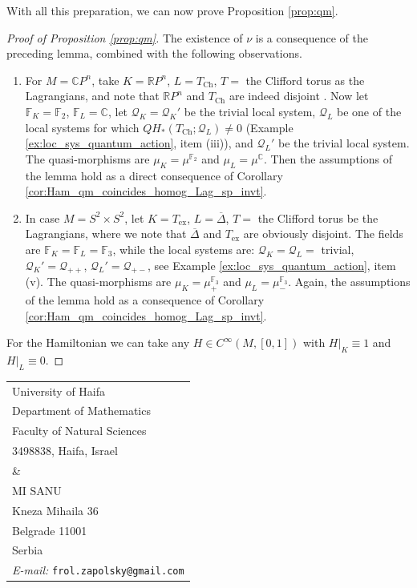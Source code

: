 \documentclass[11pt%
]{article}
\theoremstyle{definition}
\newcommand{\R}{{\mathbb{R}}}
\newcommand{\F}{{\mathbb{F}}}
\newcommand{\C}{{\mathbb{C}}}
\newcommand{\cQ}{{\mathcal{Q}}}
\newcommand{\ol}{\overline}
\DeclareMathOperator{\0}{\operatorname{\mathbf{0}}}
\begin{document}
With all this preparation, we can now prove Proposition \ref{prop:qm}.
\begin{proof}[Proof of Proposition \ref{prop:qm}]
  The existence of $\nu$ is a consequence of the preceding lemma, combined with the following observations.
  \begin{enumerate}
    \item For $M=\C P^n$, take $K=\R P^n$, $L=T_{\mathrm{Ch}}$, $T=$ the Clifford torus as the Lagrangians, and note that $\R P^n$ and $T_{\mathrm{Ch}}$ are indeed disjoint \cite{Kawamoto_Shelukhin_Spectral_Invts_Over_Integers}. Now let $\F_K=\F_2$, $\F_L=\C$, let $\cQ_K = \cQ_K'$ be the trivial local system, $\cQ_L$ be one of the local systems for which $QH_*(T_{\mathrm{Ch}};\cQ_L)\neq 0$ (Example \ref{ex:loc_sys_quantum_action}, item (iii)), and $\cQ_L'$ be the trivial local system. The quasi-morphisms are $\mu_K=\mu^{\F_2}$ and $\mu_L=\mu^{\C}$. Then the assumptions of the lemma hold as a direct consequence of Corollary \ref{cor:Ham_qm_coincides_homog_Lag_sp_invt}.
    \item In case $M=S^2\times S^2$, let $K=T_{\mathrm{ex}}$, $L = \ol\Delta$, $T=$ the Clifford torus be the Lagrangians, where we note that $\ol\Delta$ and $T_{\mathrm{ex}}$ are obviously disjoint. The fields are $\F_K=\F_L=\F_3$, while the local systems are: $\cQ_K=\cQ_L=$ trivial, $\cQ_K'=\cQ_{++}$, $\cQ_L' = \cQ_{+-}$, see Example \ref{ex:loc_sys_quantum_action}, item (v). The quasi-morphisms are $\mu_K=\mu_+^{\F_3}$ and $\mu_L=\mu_-^{\F_3}$. Again, the assumptions of the lemma hold as a consequence of Corollary \ref{cor:Ham_qm_coincides_homog_Lag_sp_invt}.
  \end{enumerate}
  For the Hamiltonian we can take any $H \in C^\infty(M,[0,1])$ with $H|_K\equiv 1$ and $H|_L\equiv 0$.
\end{proof}







\noindent
\begin{tabular}{l}
University of Haifa \\
Department of Mathematics \\
Faculty of Natural Sciences \\
3498838, Haifa, Israel \\
\&\\
MI SANU \\
Kneza Mihaila 36 \\
Belgrade 11001\\
Serbia\\
{\em E-mail:}  \texttt{frol.zapolsky@gmail.com}
\end{tabular}
\end{document}
